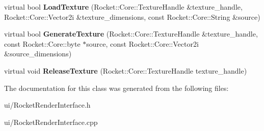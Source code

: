 \begin{DoxyCompactItemize}
\item 
\hypertarget{classRocketRenderInterface_ae0fbd11756f2149e7b36fbc8b50cc530}{virtual bool {\bfseries \-Load\-Texture} (\-Rocket\-::\-Core\-::\-Texture\-Handle \&texture\-\_\-handle, \-Rocket\-::\-Core\-::\-Vector2i \&texture\-\_\-dimensions, const \-Rocket\-::\-Core\-::\-String \&source)}\label{classRocketRenderInterface_ae0fbd11756f2149e7b36fbc8b50cc530}

\item 
\hypertarget{classRocketRenderInterface_a6cc6d32f575fe35d40b34e9c65700b3b}{virtual bool {\bfseries \-Generate\-Texture} (\-Rocket\-::\-Core\-::\-Texture\-Handle \&texture\-\_\-handle, const \-Rocket\-::\-Core\-::byte $\ast$source, const \-Rocket\-::\-Core\-::\-Vector2i \&source\-\_\-dimensions)}\label{classRocketRenderInterface_a6cc6d32f575fe35d40b34e9c65700b3b}

\item 
\hypertarget{classRocketRenderInterface_a2d2ba55df298a56d95992d4314651966}{virtual void {\bfseries \-Release\-Texture} (\-Rocket\-::\-Core\-::\-Texture\-Handle texture\-\_\-handle)}\label{classRocketRenderInterface_a2d2ba55df298a56d95992d4314651966}

\end{DoxyCompactItemize}


\-The documentation for this class was generated from the following files\-:\begin{DoxyCompactItemize}
\item 
ui/\-Rocket\-Render\-Interface.\-h\item 
ui/\-Rocket\-Render\-Interface.\-cpp\end{DoxyCompactItemize}
